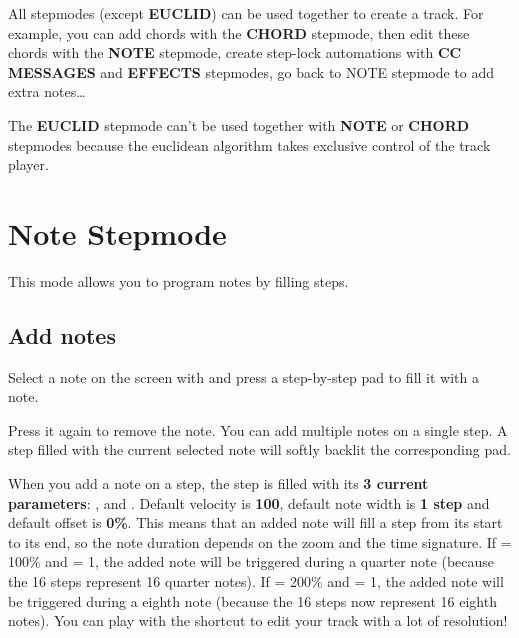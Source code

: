 All stepmodes (except \textbf{EUCLID}) can be used together to create a track. For example, you can add chords with the \textbf{CHORD} stepmode, then edit these chords with the \textbf{NOTE} stepmode, create step-lock automations with \textbf{CC MESSAGES} and \textbf{EFFECTS} stepmodes, go back to NOTE stepmode to add extra notes\ldots

The \textbf{EUCLID} stepmode can't be used together with \textbf{NOTE} or \textbf{CHORD} stepmodes because the euclidean algorithm takes exclusive control of the track player.


\section{Note Stepmode}

This mode allows you to program notes by filling steps.

\subsection{Add notes}
Select a note on the screen with \encodericon{} and press a step-by-step pad \padsicon{} to fill it with a note.


Press it again to remove the note. You can add multiple notes on a single step. A step filled with the current selected note will softly backlit the corresponding pad.



When you add a note on a step, the step is filled with its \textbf{3 current parameters}: ,  and . Default velocity is \textbf{100}, default note width is \textbf{1 step} and default offset is \textbf{0\%}. This means that an added note will fill a step from its start to its end, so the note duration depends on the zoom and the time signature. If  = 100\% and  = 1, the added note will be triggered during a quarter note (because the 16 steps represent 16 quarter notes). If  = 200\% and  = 1, the added note will be triggered during a eighth note (because the 16 steps now represent 16 eighth notes). You can play with the  shortcut to edit your track with a lot of resolution!

